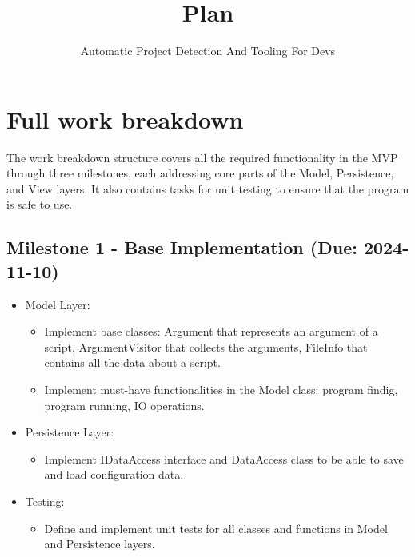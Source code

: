 \documentclass{article}
\title{Plan}
\author{Automatic Project Detection And Tooling For Devs}
\date{}
\begin{document}
\maketitle

\section{Full work breakdown}

The work breakdown structure covers all the required functionality in the MVP through three milestones, each addressing core parts of the Model, Persistence, and View layers. It also contains tasks for unit testing to ensure that the program is safe to use.

\subsection*{Milestone 1 - Base Implementation (Due: 2024-11-10)}
\begin{itemize}
    \item Model Layer:
        \begin{itemize}
            \item Implement base classes\@: Argument that represents an argument of a script, ArgumentVisitor that collects the arguments, FileInfo that contains all the data about a script.
            \item Implement must-have functionalities in the Model class: program findig, program running, IO operations.
        \end{itemize}
    \item Persistence Layer:
        \begin{itemize}
            \item Implement IDataAccess interface and DataAccess class to be able to save and load configuration data.
        \end{itemize}
    \item Testing:
        \begin{itemize}
            \item Define and implement unit tests for all classes and functions in Model and Persistence layers.
        \end{itemize}
\end{itemize}
\end{document}
